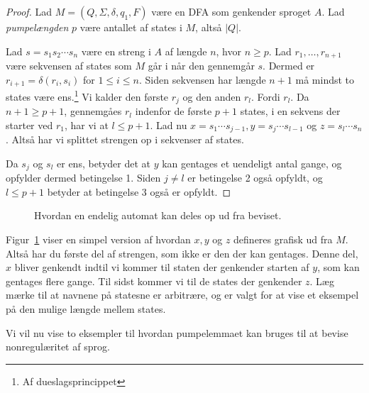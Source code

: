 \begin{proof}
  Lad $M = (Q, \Sigma, \delta, q_{1}, F)$ være en DFA som genkender sproget $A$. Lad \textit{pumpelængden} $p$ være antallet af states i $M$, altså $|Q|$.

  Lad $s = s_{1}s_{2} \cdots s_{n}$ være en streng i $A$ af længde $n$, hvor $n \geq p$. Lad $r_{1}, \ldots, r_{n+1}$ være sekvensen af states som $M$ går i når den gennemgår $s$. Dermed er $r_{i+1} = \delta(r_i, s_{i})$ for $1 \leq i \leq n$. Siden sekvensen har længde $n+1$ må mindst to states være ens.\footnote{Af dueslagsprincippet} Vi kalder den første $r_{j}$ og den anden $r_{l}$. Fordi $r_{l}$. Da $n+1 \geq p+1$, gennemgåes $r_{l}$ indenfor de første $p+1$ states, i en sekvens der starter ved $r_{1}$, har vi at $l \leq p+1$. Lad nu $x = s_{1} \cdots s_{j-1}, y = s_{j} \cdots s_{l-1}$ og $z = s_{l} \cdots s_{n}$. Altså har vi splittet strengen op i sekvenser af states.

  Da $s_{j}$ og $s_{l}$ er ens, betyder det at $y$ kan gentages et uendeligt antal gange, og opfylder dermed betingelse 1. Siden $j \neq l$ er betingelse 2 også opfyldt, og $l \leq p+1$ betyder at betingelse 3 også er opfyldt.
\end{proof}


\begin{figure}[ht]
  \centering
  \caption{\label{fig:pumpelemma} Hvordan en endelig automat kan deles op ud fra beviset.}
\end{figure}


Figur~\ref{fig:pumpelemma} viser en simpel version af hvordan $x, y$ og $z$ defineres grafisk ud fra $M$. Altså har du første del af strengen, som ikke er den der kan gentages. Denne del, $x$ bliver genkendt indtil vi kommer til staten der genkender starten af $y$, som kan gentages flere gange. Til sidst kommer vi til de states der genkender $z$. Læg mærke til at navnene på statesne er arbitrære, og er valgt for at vise et eksempel på den mulige længde mellem states.


Vi vil nu vise to eksempler til hvordan pumpelemmaet kan bruges til at bevise nonregulæritet af sprog.


